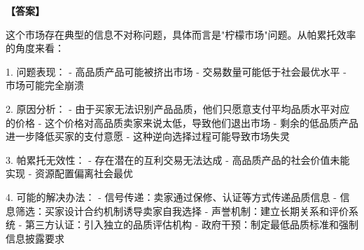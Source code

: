 \documentclass[12pt]{article}
\begin{document}
\noindent\textbf{【答案】}

这个市场存在典型的信息不对称问题，具体而言是"柠檬市场"问题。从帕累托效率的角度来看：

1. 问题表现：
   - 高品质产品可能被挤出市场
   - 交易数量可能低于社会最优水平
   - 市场可能完全崩溃

2. 原因分析：
   - 由于买家无法识别产品品质，他们只愿意支付平均品质水平对应的价格
   - 这个价格对高品质卖家来说太低，导致他们退出市场
   - 剩余的低品质产品进一步降低买家的支付意愿
   - 这种逆向选择过程可能导致市场失灵

3. 帕累托无效性：
   - 存在潜在的互利交易无法达成
   - 高品质产品的社会价值未能实现
   - 资源配置偏离社会最优

4. 可能的解决办法：
   - 信号传递：卖家通过保修、认证等方式传递品质信息
   - 信息筛选：买家设计合约机制诱导卖家自我选择
   - 声誉机制：建立长期关系和评价系统
   - 第三方认证：引入独立的品质评估机构
   - 政府干预：制定最低品质标准和强制信息披露要求
\end{document}
